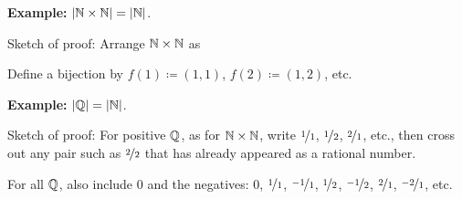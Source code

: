 \documentclass[10pt,aspectratio=149]{beamer}
\begin{document}
\begin{frame}
%
%

\textbf{Example:}
$\left\lvert {{\mathbb{N}}\times {\mathbb{N}}} \right\rvert = \left\lvert {{\mathbb{N}}} \right\rvert$.

\medskip
\pause
Sketch of proof: Arrange 
${\mathbb{N}} \times {\mathbb{N}}$ as


\hspace*{1in}{NcrossNcard.pdf_t}

\pause

Define a bijection by $f(1) \coloneqq (1,1)$, $f(2) \coloneqq (1,2)$, etc.

\medskip
\pause




\textbf{Example:}
$\left\lvert {{\mathbb{Q}}} \right\rvert=\left\lvert {{\mathbb{N}}} \right\rvert$.

\medskip
\pause
Sketch of proof:
For positive ${\mathbb{Q}}$,
as for ${\mathbb{N}} \times {\mathbb{N}}$, write
$\nicefrac{1}{1}$, $\nicefrac{1}{2}$, $\nicefrac{2}{1}$, etc.,
then cross out any pair such as $\nicefrac{2}{2}$ that
has already appeared as a rational number.

\pause
For all ${\mathbb{Q}}$, also include $0$ and the negatives:
$0$,
$\nicefrac{1}{1}$,
$\nicefrac{-1}{1}$,
$\nicefrac{1}{2}$,
$\nicefrac{-1}{2}$,
$\nicefrac{2}{1}$,
$\nicefrac{-2}{1}$,
etc.

%
%
%
%
%
%
%
%
%
%
\end{frame}
\end{document}
